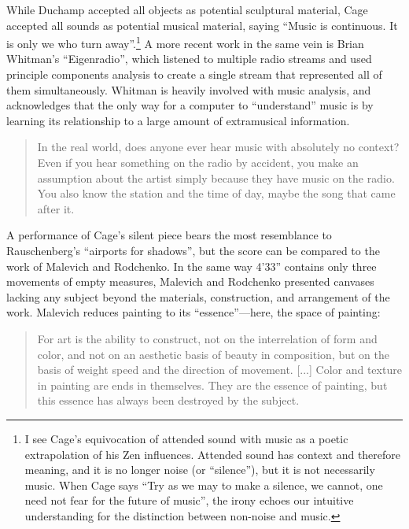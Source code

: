 \documentclass{thesis}
\begin{document}
While Duchamp accepted all objects as potential sculptural material, Cage accepted all sounds as potential musical material, saying ``Music is continuous. It is only we who turn away''.\footnote{I see Cage's equivocation of attended sound with music as a poetic extrapolation of his Zen influences. Attended sound has context and therefore meaning, and it is no longer noise (or ``silence''), but it is not necessarily music. When Cage says ``Try as we may to make a silence, we cannot, one need not fear for the future of music'', the irony echoes our intuitive understanding for the distinction between non-noise and music.} A more recent work in the same vein is Brian Whitman's ``Eigenradio''\cite{brian_whitman_eigenradio_2005}, which listened to multiple radio streams and used principle components analysis to create a single stream that represented all of them simultaneously. Whitman is heavily involved with music analysis, and acknowledges that the only way for a computer to ``understand'' music is by learning its relationship to a large amount of extramusical information.
	
	\begin{quote}
	In the real world, does anyone ever hear music with absolutely no context? Even if you hear something on the radio by accident, you make an assumption about the artist simply because they have music on the radio. You also know the station and the time of day, maybe the song that came after it.
	\end{quote}

A performance of Cage's silent piece bears the most resemblance to Rauschenberg's ``airports for shadows'', but the score can be compared to the work of Malevich and Rodchenko. In the same way 4'33'' contains only three movements of empty measures, Malevich and Rodchenko presented canvases lacking any subject beyond the materials, construction, and arrangement of the work. Malevich reduces painting to its ``essence''---here, the space of painting:

	\begin{quote}
	For art is the ability to construct, not on the interrelation of form and color, and not on an aesthetic basis of beauty in composition, but on the basis of weight speed and the direction of movement. [...] Color and texture in painting are ends in themselves. They are the essence of painting, but this essence has always been destroyed by the subject.
	\end{quote}
	
\end{document}
